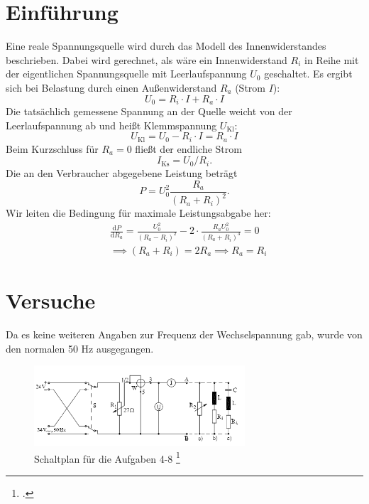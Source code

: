 \section{Einführung}
Eine reale Spannungsquelle wird durch das Modell des Innenwiderstandes beschrieben. Dabei wird gerechnet, als wäre ein Innenwiderstand $R_i$ in Reihe mit der eigentlichen Spannungsquelle mit Leerlaufspannung $U_0$ geschaltet. Es ergibt sich bei Belastung durch einen Außenwiderstand $R_a$ (Strom $I$):
\begin{equation}
  U_0=R_i\cdot I+R_a\cdot I
  \label{eq:innenwiderstand}
\end{equation}
Die tatsächlich gemessene Spannung an der Quelle weicht von der Leerlaufspannung ab und heißt Klemmspannung $U_{\text{Kl}}$:
\begin{equation}
  U_{\text{Kl}}=U_0-R_i\cdot I=R_a\cdot I
  \label{eq:klemmspannung}
\end{equation}
Beim Kurzschluss für $R_a=0$ fließt der endliche Strom
\begin{equation}
  I_{\text{Ks}}=U_0/R_i.
  \label{eq:kurzschluss}
\end{equation}
Die an den Verbraucher abgegebene Leistung beträgt
\begin{equation}
  P=U_0^2 \frac{R_a}{(R_a+R_i)^2}.
  \label{eq:leistung}
\end{equation}
Wir leiten die Bedingung für maximale Leistungsabgabe her:
\begin{align}
  &\frac{\mathrm{d}P}{\mathrm{d}R_a}=\frac{U_0^2}{(R_a-R_i)^2}-2\cdot \frac{R_a U_0^2}{(R_a+R_i)^3}=0 \\
  &\implies (R_a+R_i)=2R_a \implies R_a=R_i
  \label{eq:maxleistung}
\end{align}

\section{Versuche}
Da es keine weiteren Angaben zur Frequenz der Wechselspannung gab, wurde von den normalen 50 Hz ausgegangen.
\begin{figure}[H] 
  \centering
	\includegraphics[width=0.7\textwidth]{Schaltplan.png}
	\caption{Schaltplan für die Aufgaben 4-8 \footcite{anleitung-ws2014}}
  \label{fig:kreisel1}
\end{figure}
